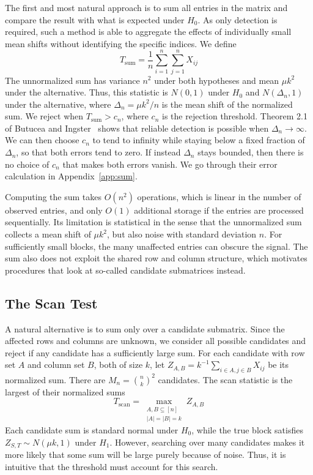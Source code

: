 \documentclass[12pt]{article}
\begin{document}
The first and most natural approach is to sum all entries in the
matrix and compare the result with what is expected under $H_0$. As
only detection is required, such a method is able to aggregate the
effects of individually small mean shifts without identifying the
specific indices. We define
\[
T_{\mathrm{sum}}=\frac1n\sum_{i=1}^n\sum_{j=1}^n X_{ij}
\]
The unnormalized sum has variance $n^2$ under both hypotheses and mean
$\mu k^2$ under the alternative. Thus, this statistic is $N(0,1)$ under
$H_0$ and $N(\Delta_n,1)$ under the alternative, where $\Delta_n=\mu k^2/n$
is the mean shift of the normalized sum. We reject when
$T_{\mathrm{sum}}>c_n$, where $c_n$ is the rejection threshold.
Theorem 2.1 of Butucea and Ingster~\cite{BI2013} shows that reliable
detection is possible when $\Delta_n\to\infty$. We can then choose $c_n$
to tend to infinity while staying below a fixed fraction of $\Delta_n$,
so that both errors tend to zero. If instead $\Delta_n$ stays bounded,
then there is no choice of $c_n$ that makes both errors vanish. We go through their error calculation in
Appendix~\ref{app:sum}.

Computing the sum takes $O(n^2)$ operations, which is linear in the
number of observed entries, and only $O(1)$ additional storage if the
entries are processed sequentially. Its limitation is statistical in the
sense that the unnormalized sum collects a mean shift of $\mu k^2$, but
also noise with standard deviation $n$. For sufficiently small blocks,
the many unaffected entries can obscure the signal. The sum also does
not exploit the shared row and column structure, which motivates procedures
that look at so-called candidate submatrices instead.

\subsection{The Scan Test}\label{sec:scan}

A natural alternative is to sum only over a candidate submatrix. Since
the affected rows and columns are unknown, we consider all possible
candidates and reject if any candidate has a sufficiently large sum.
For each candidate with row set $A$ and column set $B$, both of size
$k$, let $Z_{A,B}=k^{-1}\sum_{i\in A,j\in B}X_{ij}$ be its
normalized sum. There are $M_n=\binom nk^2$ candidates. The scan
statistic is the largest of their normalized sums
\[
T_{\mathrm{scan}}
=\max_{\substack{A,B\subseteq[n]\\|A|=|B|=k}}Z_{A,B}
\]
Each candidate sum is standard
normal under $H_0$, while the true block satisfies
$Z_{S,T}\sim N(\mu k,1)$ under $H_1$. However, searching over many
candidates makes it more likely that some sum will be large purely
because of noise. Thus, it is intuitive that the threshold must account for this search.
\end{document}
